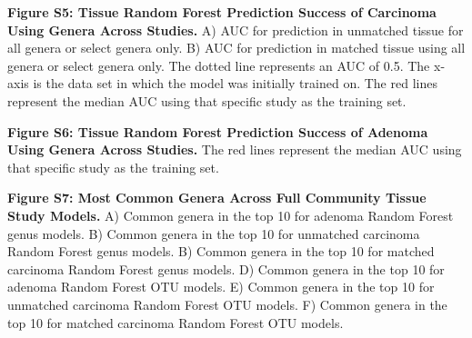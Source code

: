 \documentclass[12pt,]{article}
\begin{document}
\textbf{Figure S5: Tissue Random Forest Prediction Success of Carcinoma
Using Genera Across Studies.} A) AUC for prediction in unmatched tissue
for all genera or select genera only. B) AUC for prediction in matched
tissue using all genera or select genera only. The dotted line
represents an AUC of 0.5. The x-axis is the data set in which the model
was initially trained on. The red lines represent the median AUC using
that specific study as the training set.

\textbf{Figure S6: Tissue Random Forest Prediction Success of Adenoma
Using Genera Across Studies.} The red lines represent the median AUC
using that specific study as the training set.

\textbf{Figure S7: Most Common Genera Across Full Community Tissue Study
Models.} A) Common genera in the top 10 for adenoma Random Forest genus
models. B) Common genera in the top 10 for unmatched carcinoma Random
Forest genus models. B) Common genera in the top 10 for matched
carcinoma Random Forest genus models. D) Common genera in the top 10 for
adenoma Random Forest OTU models. E) Common genera in the top 10 for
unmatched carcinoma Random Forest OTU models. F) Common genera in the
top 10 for matched carcinoma Random Forest OTU models.

\newpage
\end{document}
